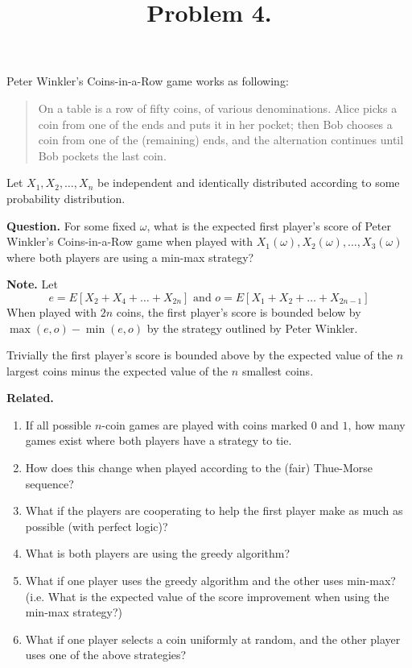 \documentclass{article}
\newenvironment{question}{\begin{trivlist}\item[\textbf{Question.}]}{\end{trivlist}}
\newenvironment{note}{\begin{trivlist}\item[\textbf{Note.}]}{\end{trivlist}}
\newenvironment{related}{\begin{trivlist}\item[\textbf{Related.}]\end{trivlist}\begin{enumerate}}{\end{enumerate}}
\begin{document}
\title{Problem 4.}
\date{}
\author{}
\maketitle

  Peter Winkler's Coins-in-a-Row game works as following:
  \begin{quote}
    On a table is a row of fifty coins, of various denominations.
    Alice picks a coin from one of the ends and puts it in her pocket;
    then Bob chooses a coin from one of the (remaining) ends,
    and the alternation continues until Bob pockets the last coin.
  \end{quote}

  Let $X_1, X_2, \hdots, X_n$ be independent and identically distributed
  according to some probability distribution.

\begin{question}
  For some fixed $\omega$, what is
  the expected first player's score of Peter Winkler's Coins-in-a-Row game when
  played with $X_1(\omega), X_2(\omega), \hdots, X_3(\omega)$ where both players
  are using a min-max strategy?
\end{question}

\begin{note}
  Let \[
    e = E[X_2 + X_4 + \hdots + X_{2n}] \text{ and }
    o = E[X_1 + X_2 + \hdots + X_{2n - 1}]
  \]
  When played with $2n$ coins, the first player's score is bounded below by $
    \max(e, o) - \min(e, o)
  $ by the strategy outlined by Peter Winkler.

  Trivially the first player's score is bounded above by the expected value of
  the $n$ largest coins minus the expected value of the $n$ smallest coins.
\end{note}

\begin{related}
  \item If all possible $n$-coin games are played with coins marked $0$ and $1$,
    how many games exist where both players have a strategy to tie.
  \item How does this change when played according to the (fair) Thue-Morse sequence?
  \item What if the players are cooperating to help the first player make as
    much as possible (with perfect logic)?
  \item What is both players are using the greedy algorithm?
  \item What if one player uses the greedy algorithm and the other uses min-max?
    (i.e. What is the expected value of the score improvement when using the
    min-max strategy?)
  \item What if one player selects a coin uniformly at random, and the other
    player uses one of the above strategies?
\end{related}
\end{document}
